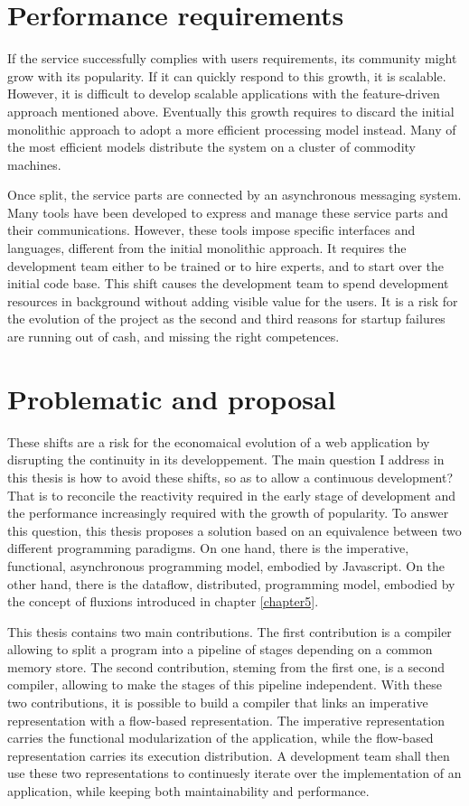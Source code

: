 \section{Performance requirements}

If the service successfully complies with users requirements, its community might grow with its popularity.
If it can quickly respond to this growth, it is scalable.
However, it is difficult to develop scalable applications with the feature-driven approach mentioned above.
Eventually this growth requires to discard the initial monolithic approach to adopt a more efficient processing model instead.
Many of the most efficient models distribute the system on a cluster of commodity machines.

Once split, the service parts are connected by an asynchronous messaging system.
Many tools have been developed to express and manage these service parts and their communications.
However, these tools impose specific interfaces and languages, different from the initial monolithic approach.
It requires the development team either to be trained or to hire experts, and to start over the initial code base.
This shift causes the development team to spend development resources in background without adding visible value for the users.
It is a risk for the evolution of the project as the second and third reasons for startup failures are running out of cash, and missing the right competences.

\section{Problematic and proposal}

These shifts are a risk for the economaical evolution of a web application by disrupting the continuity in its developpement.
The main question I address in this thesis is how to avoid these shifts, so as to allow a continuous development?
That is to reconcile the reactivity required in the early stage of development and the performance increasingly required with the growth of popularity.
To answer this question, this thesis proposes a solution based on an equivalence between two different programming paradigms.
On one hand, there is the imperative, functional, asynchronous programming model, embodied by Javascript.
On the other hand, there is the dataflow, distributed, programming model, embodied by the concept of fluxions introduced in chapter \ref{chapter5}.

This thesis contains two main contributions.
The first contribution is a compiler allowing to split a program into a pipeline of stages depending on a common memory store.
The second contribution, steming from the first one, is a second compiler, allowing to make the stages of this pipeline independent.
With these two contributions, it is possible to build a compiler that links an imperative representation with a flow-based representation.
The imperative representation carries the functional modularization of the application, while the flow-based representation carries its execution distribution.
A development team shall then use these two representations to continuesly iterate over the implementation of an application, while keeping both maintainability and performance.

